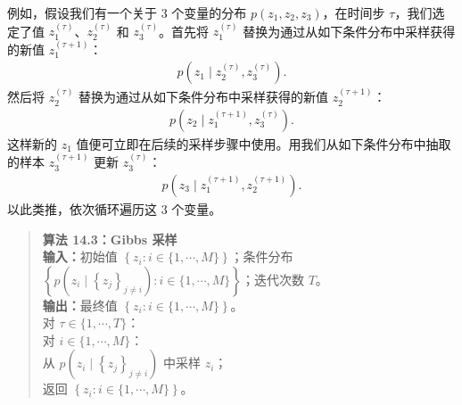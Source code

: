 \documentclass[../../main.tex]{subfiles}
\begin{document}
例如，假设我们有一个关于 $3$ 个变量的分布 $p\!\left(z_{1},z_{2},z_{3}\right)$，在时间步 $\tau$，我们选定了值 $z_{1}^{(\tau)}$、$z_{2}^{(\tau)}$ 和 $z_{3}^{(\tau)}$。首先将 $z_{1}^{(\tau)}$ 替换为通过从如下条件分布中采样获得的新值 $z_{1}^{(\tau+1)}$：
\begin{align}
p\!\left(z_{1}\mid z_{2}^{(\tau)},z_{3}^{(\tau)}\right).
\label{align:ch14-gibbs条件1}
\end{align}
然后将 $z_{2}^{(\tau)}$ 替换为通过从如下条件分布中采样获得的新值 $z_{2}^{(\tau+1)}$：
\begin{align}
p\!\left(z_{2}\mid z_{1}^{(\tau+1)},z_{3}^{(\tau)}\right).
\label{align:ch14-gibbs条件2}
\end{align}
这样新的 $z_{1}$ 值便可立即在后续的采样步骤中使用。用我们从如下条件分布中抽取的样本 $z_{3}^{(\tau+1)}$ 更新 $z_{3}^{(\tau)}$：
\begin{align}
p\!\left(z_{3}\mid z_{1}^{(\tau+1)},z_{2}^{(\tau+1)}\right).
\label{align:ch14-gibbs条件3}
\end{align}
以此类推，依次循环遍历这 $3$ 个变量。

\begin{quote}
\small
\textbf{算法 14.3：Gibbs 采样}\\
\textbf{输入：}初始值 $\left\{z_{i}:i\in\{1,\cdots,M\}\right\}$；条件分布 $\left\{p\!\left(z_{i}\mid\left\{z_{j}\right\}_{j\neq i}\right):i\in\{1,\cdots,M\}\right\}$；迭代次数 $T$。\\
\textbf{输出：}最终值 $\left\{z_{i}:i\in\{1,\cdots,M\}\right\}$。\\
对 $\tau\in\{1,\cdots,T\}$：\\
\quad 对 $i\in\{1,\cdots,M\}$：\\
\quad\quad 从 $p\!\left(z_{i}\mid\left\{z_{j}\right\}_{j\neq i}\right)$ 中采样 $z_{i}$；\\
返回 $\left\{z_{i}:i\in\{1,\cdots,M\}\right\}$。
\end{quote}
\end{document}
